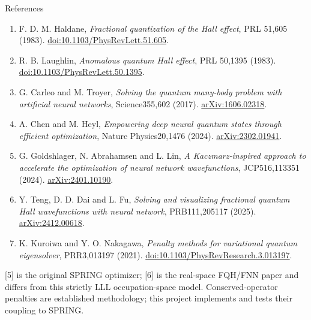 \documentclass[aspectratio=169,10pt]{beamer}
\newcommand{\src}[1]{\vfill{\fontsize{6.3}{7.5}\selectfont\color{muted}#1\par}}
\begin{document}
\begin{frame}{References}
\footnotesize
\begin{enumerate}\setlength\itemsep{4pt}
\item F. D. M. Haldane, \emph{Fractional quantization of the Hall effect}, PRL 51,605 (1983). \href{https://doi.org/10.1103/PhysRevLett.51.605}{doi:10.1103/PhysRevLett.51.605}.
\item R. B. Laughlin, \emph{Anomalous quantum Hall effect}, PRL 50,1395 (1983). \href{https://doi.org/10.1103/PhysRevLett.50.1395}{doi:10.1103/PhysRevLett.50.1395}.
\item G. Carleo and M. Troyer, \emph{Solving the quantum many-body problem with artificial neural networks}, Science355,602 (2017). \href{https://arxiv.org/abs/1606.02318}{arXiv:1606.02318}.
\item A. Chen and M. Heyl, \emph{Empowering deep neural quantum states through efficient optimization}, Nature Physics20,1476 (2024). \href{https://arxiv.org/abs/2302.01941}{arXiv:2302.01941}.
\item G. Goldshlager, N. Abrahamsen and L. Lin, \emph{A Kaczmarz-inspired approach to accelerate the optimization of neural network wavefunctions}, JCP516,113351 (2024). \href{https://arxiv.org/abs/2401.10190}{arXiv:2401.10190}.
\item Y. Teng, D. D. Dai and L. Fu, \emph{Solving and visualizing fractional quantum Hall wavefunctions with neural network}, PRB111,205117 (2025). \href{https://arxiv.org/abs/2412.00618}{arXiv:2412.00618}.
\item K. Kuroiwa and Y. O. Nakagawa, \emph{Penalty methods for variational quantum eigensolver}, PRR3,013197 (2021). \href{https://doi.org/10.1103/PhysRevResearch.3.013197}{doi:10.1103/PhysRevResearch.3.013197}.
\end{enumerate}
\src{[5] is the original SPRING optimizer; [6] is the real-space FQH/FNN paper and differs from this strictly LLL occupation-space model. Conserved-operator penalties are established methodology; this project implements and tests their coupling to SPRING.}
\end{frame}
\end{document}
